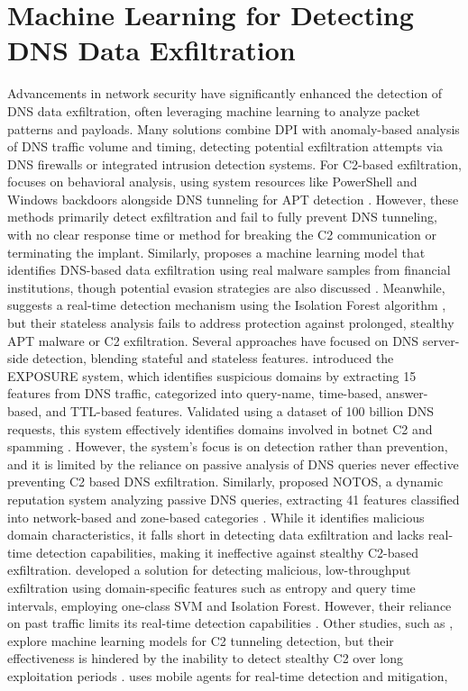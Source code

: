 \documentclass [11pt, proquest] {uwthesis}[2020/02/24]
\begin{document}
\section{Machine Learning for Detecting DNS Data Exfiltration}
Advancements in network security have significantly enhanced the detection of DNS data exfiltration, often leveraging machine learning to analyze packet patterns and payloads. Many solutions combine DPI with anomaly-based analysis of DNS traffic volume and timing, detecting potential exfiltration attempts via DNS firewalls or integrated intrusion detection systems. For C2-based exfiltration, \citeauthor{apt-process} focuses on behavioral analysis, using system resources like PowerShell and Windows backdoors alongside DNS tunneling for APT detection \cite{apt-process}. However, these methods primarily detect exfiltration and fail to fully prevent DNS tunneling, with no clear response time or method for breaking the C2 communication or terminating the implant. Similarly, \citeauthor{Das} proposes a machine learning model that identifies DNS-based data exfiltration using real malware samples from financial institutions, though potential evasion strategies are also discussed \cite{Das}. Meanwhile, \citeauthor{8717806d} suggests a real-time detection mechanism using the Isolation Forest algorithm \cite{8717806d}, but their stateless analysis fails to address protection against prolonged, stealthy APT malware or C2 exfiltration. Several approaches have focused on DNS server-side detection, blending stateful and stateless features. \citeauthor{bilge2011exposure} introduced the EXPOSURE system, which identifies suspicious domains by extracting 15 features from DNS traffic, categorized into query-name, time-based, answer-based, and TTL-based features. Validated using a dataset of 100 billion DNS requests, this system effectively identifies domains involved in botnet C2 and spamming \cite{bilge2011exposure}. However, the system’s focus is on detection rather than prevention, and it is limited by the reliance on passive analysis of DNS queries never effective preventing C2 based DNS exfiltration. Similarly, \citeauthor{antonakakis2010building} proposed NOTOS, a dynamic reputation system analyzing passive DNS queries, extracting 41 features classified into network-based and zone-based categories \cite{antonakakis2010building}. While it identifies malicious domain characteristics, it falls short in detecting data exfiltration and lacks real-time detection capabilities, making it ineffective against stealthy C2-based exfiltration. \citeauthor{DBLP:journals/corr/abs-1709-08395} developed a solution for detecting malicious, low-throughput exfiltration using domain-specific features such as entropy and query time intervals, employing one-class SVM and Isolation Forest. However, their reliance on past traffic limits its real-time detection capabilities \cite{DBLP:journals/corr/abs-1709-08395}. Other studies, such as \citeauthor{10.1145/3230833.3233278}, explore machine learning models for C2 tunneling detection, but their effectiveness is hindered by the inability to detect stealthy C2 over long exploitation periods \cite{10.1145/3230833.3233278}. \citeauthor{9486400} uses mobile agents for real-time detection and mitigation, 
\end{document}
